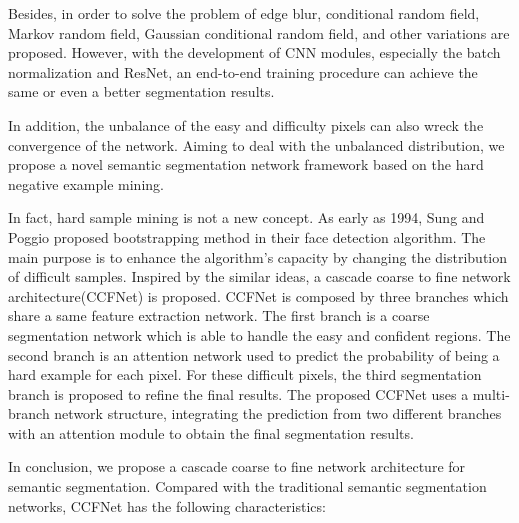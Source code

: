\documentclass[10.5pt,compsoc]{TsT}
\newcommand{\upcite}[1]{\superscript{\textsuperscript{\cite{#1}}}}
\theoremstyle{mystyle}
\newcommand{\upcite}[1]{\textsuperscript{\cite{#1}}}
\begin{document}
{Besides, in order to solve the problem of edge blur, conditional random field, Markov random field, Gaussian conditional random field, and other variations are proposed. However, with the development of CNN modules, especially the batch normalization and ResNet\upcite{7}, an end-to-end training procedure can achieve the same or even a better segmentation results.

In addition, the unbalance of the easy and difficulty pixels can also wreck the convergence of the network. Aiming to  deal with the unbalanced distribution, we propose a novel semantic segmentation network framework based on the hard negative example mining.

In fact, hard sample mining is not a new concept. As early as 1994, Sung and Poggio proposed bootstrapping method in their face detection algorithm. The main purpose is to enhance the algorithm's capacity by changing the distribution of difficult samples. Inspired by the similar ideas, a cascade coarse to fine network architecture(CCFNet) is proposed. CCFNet is composed by three branches which share a same feature extraction network. The first branch is a coarse segmentation network which is able to handle the easy and confident regions. The second branch is an attention network used to predict the probability of being a hard example for each pixel. For these difficult pixels, the third segmentation branch is proposed to refine the final results. The proposed CCFNet uses a multi-branch network structure, integrating the prediction from two different branches with an attention module to obtain the final segmentation results.

In conclusion, we propose a cascade coarse to fine network architecture for semantic segmentation. Compared with the traditional semantic segmentation networks, CCFNet has the following characteristics: 


}
\end{document}
